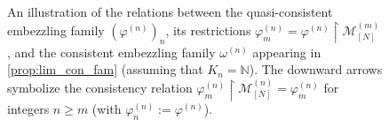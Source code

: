 \documentclass[a4paper, 10pt, onecolumn, accepted=2025-07-22]{quantumarticle}
\theoremstyle{definition}
\newcommand{\mc}{\mathcal}
\newcommand{\up}[1]{^{(#1)}}
\def\M{{\mc M}}
\def\NN{{\mathbb N}}
\newcommand*{\1}{\text{\usefont{U}{bbold}{m}{n}1}}
\newcommand{\placeholder}[0]{{\,\cdot\,}}
\begin{document}
\begin{figure}[t]
\begin{center}
	


	



    
\caption{\small An illustration of the relations between the quasi-consistent embezzling family $(\varphi^{(n)})_{n}$, its restrictions $\varphi^{(n)}_{m} = \varphi\up{n}\restriction \M\up{m}_{[N]}$, and the consistent embezzling family $\omega\up{n}$ appearing in \cref{prop:lim_con_fam} (assuming that $K_n=\NN$).
The downward arrows symbolize the consistency relation $\varphi\up n_{m} \upharpoonright \M_{[N]}\up n = \varphi\up n_m$ for integers $n\ge m$ (with $\varphi\up n_n := \varphi\up n$).
}
\label{fig:Wtree}
\end{center}
\end{figure}
\end{document}
